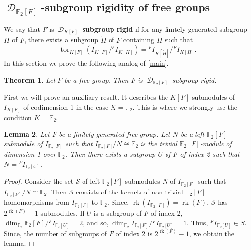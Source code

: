 \documentclass{amsart}
\newtheorem{lem}{Lemma}[section]
\newtheorem{teo}[lem]{Theorem}
\theoremstyle{definition}
\theoremstyle{remark}
\DeclareMathOperator{\D}{\mathcal D}
\DeclareMathOperator{\tor}{tor}
\DeclareMathOperator{\rk}{rk}
\newcommand{\F}{\mathbb{F}}
\begin{document}
\subsection{$\D_{\F_2[F]}$-subgroup rigidity of free groups} \label{casep=2}
We say that $F$ is $\D_{K[F]}$-{\bf subgroup rigid} if for any finitely generated subgroup $H$ of $F$, there exists a subgroup $\widetilde H$ of $F$ containing $H$ such that 
$$\tor_{K[F]}(I_{K[F]}/{}^FI_{K[H]})={}^FI_{K[\widetilde H]}/{}^FI_{K[H]}.$$ In this section we prove the following analog of \cref{main}.
\begin{teo}\label{mainF2} Let $F$ be a free group. Then $F$ is
 $\D_{\F_2[F]}$-subgroup rigid.
\end{teo}
First we will prove  an auxiliary result.
It describes the $K[F]$-submodules of $I_{K[F]}$ of codimension 1 in the case $K=\F_2$. This is where we strongly use the condition $K=\F_2$.
\begin {lem}\label{maxsubm} Let $F$ be a finitely generated free group.
Let $N$ be a left $\F_2[F]$-submodule of $I_{\F_2[F]}$ such that $I_{\F_2[F]}/N\cong \F_2$ is the trivial $\F_2[F]$-module of dimension 1 over $\F_2$. Then there exists a subgroup $U$ of $F$ of index 2 such that $N={}^FI_{\F_2[U]}$.
\end{lem}
\begin{proof}Consider the set $\mathcal S$ of left $\F_2[F]$-submodules $N$ of $I_{\F_2[F]}$ such that $I_{\F_2[F]}/N\cong \F_2$. Then $\mathcal S$ consists of the kernels of non-trivial $\F_2[F]$-homomorphisms from $I_{\F_2[F]}$ to $\F_2$. Since, $\rk(I_{\F_2[F]})=\rk(F)$, $\mathcal S$ has $2^{\rk(F)}-1$ submodules. If $U$ is a subgroup of  $F$ of index 2, $\dim_{\F_2}\F_2[F]/{}^FI_{\F_2[U]}=2$, and so, $\dim_{\F_2}I_{\F_2[F]}/{}^FI_{\F_2[U]}=1$. Thus, ${}^FI_{\F_2[U]}\in S$. Since, the number of subgroups of  $F$ of index 2 is $2^{\rk(F)}-1$, we obtain the lemma.
\end{proof}
 
\end{document}
